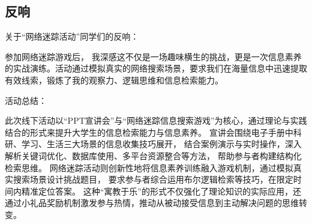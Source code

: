 \subsection{反响}
关于``网络迷踪活动''同学们的反响：
\begin{notebox}
    ​参加网络迷踪游戏后，
    我深感这不仅是一场趣味横生的挑战，更是一次信息素养的实战演练。
    ​活动通过模拟真实的网络搜索场景，要求我们在海量信息中迅速提取有效线索，锻炼了我的观察力、逻辑思维和信息检索能力。
\end{notebox}
活动总结：

此次线下活动以“PPT宣讲会”与“网络迷踪信息搜索游戏”为核心，通过理论与实践结合的形式来提升大学生的信息检索能力与信息素养。
宣讲会围绕电子手册中科研、学习、生活三大场景的信息收集技巧展开，
结合案例演示与实时操作，深入解析关键词优化、数据库使用、多平台资源整合等方法，
帮助参与者构建结构化检索思维。
网络迷踪活动则创新性地将信息素养训练融入游戏机制，通过模拟真实搜索场景设计挑战题目，
要求参与者综合运用布尔逻辑检索等技巧，在限定时间内精准定位答案。
这种“寓教于乐”的形式不仅强化了理论知识的实际应用，还通过小礼品奖励机制激发参与热情，推动从被动接受信息到主动解决问题的思维转变。